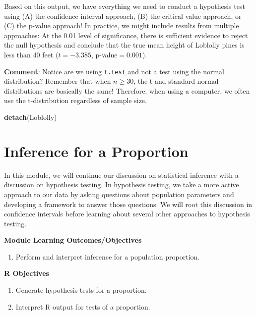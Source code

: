 \documentclass[
]{book}
\newenvironment{Shaded}{\begin{snugshade}}{\end{snugshade}}
\newcommand{\FunctionTok}[1]{\textcolor[rgb]{0.13,0.29,0.53}{\textbf{#1}}}
\newcommand{\NormalTok}[1]{#1}
\providecommand{\tightlist}{%
  \setlength{\itemsep}{0pt}\setlength{\parskip}{0pt}}
\begin{document}
Based on this output, we have everything we need to conduct a hypothesis test using (A) the confidence interval approach, (B) the critical value approach, or (C) the p-value approach! In practice, we might include results from multiple approaches: At the 0.01 level of significance, there is sufficient evidence to reject the null hypothesis and conclude that the true mean height of Loblolly pines is less than 40 feet (\(t = -3.385\), p-value\(=0.001\)).

\textbf{Comment}: Notice are we using \texttt{t.test} and not a test using the normal distribution? Remember that when \(n \ge 30\), the t and standard normal distributions are basically the same! Therefore, when using a computer, we often use the t-distribution regardless of sample size.

\begin{Shaded}
\begin{Highlighting}[]
\FunctionTok{detach}\NormalTok{(Loblolly)}
\end{Highlighting}
\end{Shaded}

\chapter{Inference for a Proportion}\label{inference-for-a-proportion}

In this module, we will continue our discussion on statistical inference with a discussion on hypothesis testing. In hypothesis testing, we take a more active approach to our data by asking questions about population parameters and developing a framework to answer those questions. We will root this discussion in confidence intervals before learning about several other approaches to hypothesis testing.

\textbf{Module Learning Outcomes/Objectives}

\begin{enumerate}
\def\labelenumi{\arabic{enumi}.}
\tightlist
\item
  Perform and interpret inference for a population proportion.
\end{enumerate}

\textbf{R Objectives}

\begin{enumerate}
\def\labelenumi{\arabic{enumi}.}
\tightlist
\item
  Generate hypothesis tests for a proportion.
\item
  Interpret R output for tests of a proportion.
\end{enumerate}
\end{document}
